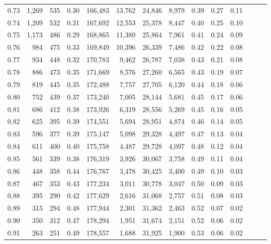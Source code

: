 \begin{tabular}{rrrrrrrrrrrrrr}
0.73 &  1,269 &  535 &  0.30 &  166,483 &   13,762 &  24,846 &   8,979 &  0.39 &  0.27 &      0.11 \\
0.74 &  1,209 &  532 &  0.31 &  167,692 &   12,553 &  25,378 &   8,447 &  0.40 &  0.25 &      0.10 \\
0.75 &  1,173 &  486 &  0.29 &  168,865 &   11,380 &  25,864 &   7,961 &  0.41 &  0.24 &      0.09 \\
0.76 &    984 &  475 &  0.33 &  169,849 &   10,396 &  26,339 &   7,486 &  0.42 &  0.22 &      0.08 \\
0.77 &    934 &  448 &  0.32 &  170,783 &    9,462 &  26,787 &   7,038 &  0.43 &  0.21 &      0.08 \\
0.78 &    886 &  473 &  0.35 &  171,669 &    8,576 &  27,260 &   6,565 &  0.43 &  0.19 &      0.07 \\
0.79 &    819 &  445 &  0.35 &  172,488 &    7,757 &  27,705 &   6,120 &  0.44 &  0.18 &      0.06 \\
0.80 &    752 &  439 &  0.37 &  173,240 &    7,005 &  28,144 &   5,681 &  0.45 &  0.17 &      0.06 \\
0.81 &    686 &  412 &  0.38 &  173,926 &    6,319 &  28,556 &   5,269 &  0.45 &  0.16 &      0.05 \\
0.82 &    625 &  395 &  0.39 &  174,551 &    5,694 &  28,951 &   4,874 &  0.46 &  0.14 &      0.05 \\
0.83 &    596 &  377 &  0.39 &  175,147 &    5,098 &  29,328 &   4,497 &  0.47 &  0.13 &      0.04 \\
0.84 &    611 &  400 &  0.40 &  175,758 &    4,487 &  29,728 &   4,097 &  0.48 &  0.12 &      0.04 \\
0.85 &    561 &  339 &  0.38 &  176,319 &    3,926 &  30,067 &   3,758 &  0.49 &  0.11 &      0.04 \\
0.86 &    448 &  358 &  0.44 &  176,767 &    3,478 &  30,425 &   3,400 &  0.49 &  0.10 &      0.03 \\
0.87 &    467 &  353 &  0.43 &  177,234 &    3,011 &  30,778 &   3,047 &  0.50 &  0.09 &      0.03 \\
0.88 &    395 &  290 &  0.42 &  177,629 &    2,616 &  31,068 &   2,757 &  0.51 &  0.08 &      0.03 \\
0.89 &    315 &  294 &  0.48 &  177,944 &    2,301 &  31,362 &   2,463 &  0.52 &  0.07 &      0.02 \\
0.90 &    350 &  312 &  0.47 &  178,294 &    1,951 &  31,674 &   2,151 &  0.52 &  0.06 &      0.02 \\
0.91 &    263 &  251 &  0.49 &  178,557 &    1,688 &  31,925 &   1,900 &  0.53 &  0.06 &      0.02 \\

\end{tabular}
